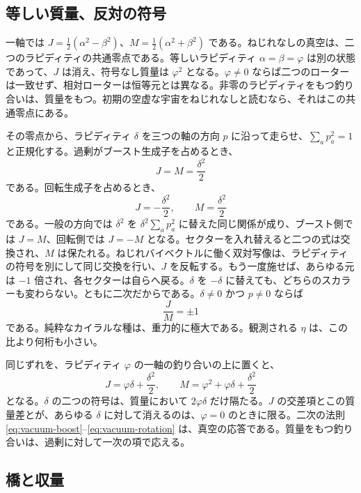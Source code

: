 \documentclass[a4paper]{article}
\begin{document}
\subsection{等しい質量、反対の符号}

一軸では $J=\tfrac12(\alpha^2-\beta^2)$、$M=\tfrac12(\alpha^2+\beta^2)$ である。ねじれなしの真空は、二つのラピディティの共通零点である。等しいラピディティ $\alpha=\beta=\varphi$ は別の状態であって、$J$ は消え、符号なし質量は $\varphi^2$ となる。$\varphi\neq 0$ ならば二つのローターは一致せず、相対ローターは恒等元とは異なる。非零のラピディティをもつ釣り合いは、質量をもつ。初期の空虚な宇宙をねじれなしと読むなら、それはこの共通零点にある。

その零点から、ラピディティ $\delta$ を三つの軸の方向 $p$ に沿って走らせ、$\sum_a p_a^2=1$ と正規化する。過剰がブースト生成子を占めるとき、
\begin{equation}
\label{eq:vacuum-boost}
J=M=\frac{\delta^2}{2}
\end{equation}
である。回転生成子を占めるとき、
\begin{equation}
\label{eq:vacuum-rotation}
J=-\frac{\delta^2}{2},\qquad M=\frac{\delta^2}{2}
\end{equation}
である。一般の方向では $\delta^2$ を $\delta^2\sum_a p_a^2$ に替えた同じ関係が成り、ブースト側では $J=M$、回転側では $J=-M$ となる。セクターを入れ替えると二つの式は交換され、$M$ は保たれる。ねじれバイベクトルに働く双対写像は、ラピディティの符号を別にして同じ交換を行い、$J$ を反転する。もう一度施せば、あらゆる元は $-1$ 倍され、各セクターは自らへ戻る。$\delta$ を $-\delta$ に替えても、どちらのスカラーも変わらない。ともに二次だからである。$\delta\neq 0$ かつ $p\neq 0$ ならば
\[
\frac{J}{M}=\pm 1
\]
である。純粋なカイラルな種は、重力的に極大である。観測される $\eta$ は、この比より何桁も小さい。

同じずれを、ラピディティ $\varphi$ の一軸の釣り合いの上に置くと、
\begin{equation}
\label{eq:balanced-shift}
J=\varphi\delta+\frac{\delta^2}{2},\qquad
M=\varphi^2+\varphi\delta+\frac{\delta^2}{2}
\end{equation}
となる。$\delta$ の二つの符号は、質量において $2\varphi\delta$ だけ隔たる。$J$ の交差項とこの質量差とが、あらゆる $\delta$ に対して消えるのは、$\varphi=0$ のときに限る。二次の法則 \eqref{eq:vacuum-boost}--\eqref{eq:vacuum-rotation} は、真空の応答である。質量をもつ釣り合いは、過剰に対して一次の項で応える。

\subsection{橋と収量}
\end{document}
